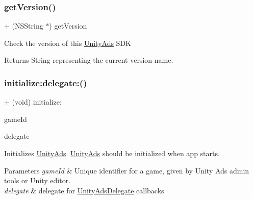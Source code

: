 \subsubsection{\texorpdfstring{getVersion()}{getVersion()}}
{\footnotesize\ttfamily + (N\+S\+String $\ast$) get\+Version \begin{DoxyParamCaption}{ }\end{DoxyParamCaption}}

Check the version of this {\ttfamily \mbox{\hyperlink{interface_unity_ads}{Unity\+Ads}}} S\+DK

\begin{DoxyReturn}{Returns}
String representing the current version name. 
\end{DoxyReturn}
\mbox{\label{interface_unity_ads_a89dc56c878efb376b6014d0ef67778a9}} 
\subsubsection{\texorpdfstring{initialize:delegate:()}{initialize:delegate:()}}
{\footnotesize\ttfamily + (void) initialize\+: \begin{DoxyParamCaption}\item[{(N\+S\+String $\ast$)}]{game\+Id }\item[{delegate\+:(nullable id$<$ \mbox{\hyperlink{protocol_unity_ads_delegate-p}{Unity\+Ads\+Delegate}} $>$)}]{delegate }\end{DoxyParamCaption}}

Initializes \mbox{\hyperlink{interface_unity_ads}{Unity\+Ads}}. \mbox{\hyperlink{interface_unity_ads}{Unity\+Ads}} should be initialized when app starts.


\begin{DoxyParams}{Parameters}
{\em game\+Id} & Unique identifier for a game, given by Unity Ads admin tools or Unity editor. \\
\hline
{\em delegate} & delegate for \mbox{\hyperlink{protocol_unity_ads_delegate-p}{Unity\+Ads\+Delegate}} callbacks \\
\hline
\end{DoxyParams}
\mbox{\label{interface_unity_ads_a95a142d4966bb89652bfec178795e017}} 
